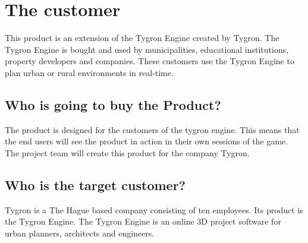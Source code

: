 \section{The customer}
This product is an extension of the Tygron Engine created by Tygron. The Tygron Engine is bought and used by municipalities, educational institutions, property developers and companies. These customers use the Tygron Engine to plan urban or rural environments in real-time. \newline

\subsection{Who is going to buy the Product?}
The product is designed for the customers of the tygron engine. This means that the end users will see the product in action in their own sessions of the game. The project team will create this product for the company Tygron. \newline

\subsection{Who is the target customer?}
Tygron is a The Hague based company consisting of ten employees. Its product is the Tygron Engine. The Tygron Engine is an online 3D project software for urban planners, architects and engineers.
